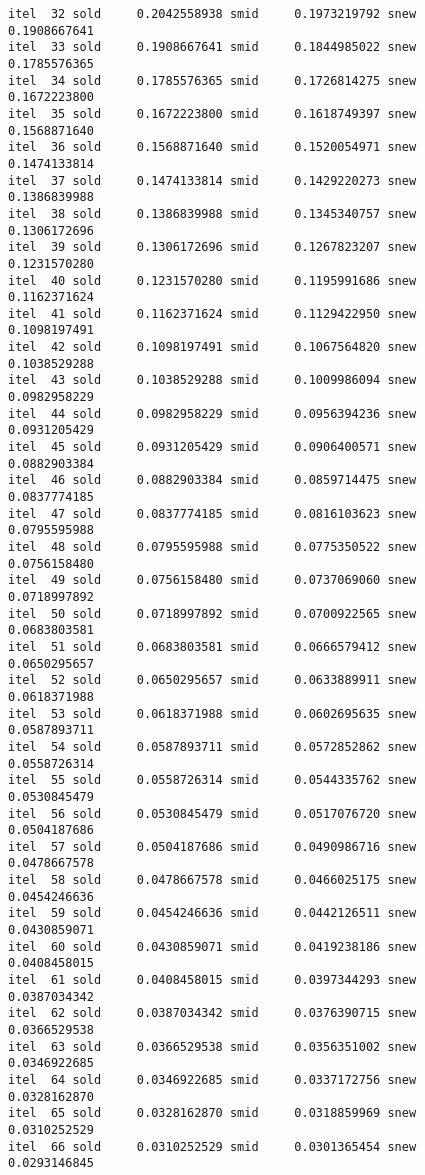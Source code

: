 \documentclass[
  12pt,
  letterpaper,
  DIV=11,
  numbers=noendperiod]{scrartcl}
\begin{document}
\begin{verbatim}
itel  32 sold     0.2042558938 smid     0.1973219792 snew     0.1908667641 
itel  33 sold     0.1908667641 smid     0.1844985022 snew     0.1785576365 
itel  34 sold     0.1785576365 smid     0.1726814275 snew     0.1672223800 
itel  35 sold     0.1672223800 smid     0.1618749397 snew     0.1568871640 
itel  36 sold     0.1568871640 smid     0.1520054971 snew     0.1474133814 
itel  37 sold     0.1474133814 smid     0.1429220273 snew     0.1386839988 
itel  38 sold     0.1386839988 smid     0.1345340757 snew     0.1306172696 
itel  39 sold     0.1306172696 smid     0.1267823207 snew     0.1231570280 
itel  40 sold     0.1231570280 smid     0.1195991686 snew     0.1162371624 
itel  41 sold     0.1162371624 smid     0.1129422950 snew     0.1098197491 
itel  42 sold     0.1098197491 smid     0.1067564820 snew     0.1038529288 
itel  43 sold     0.1038529288 smid     0.1009986094 snew     0.0982958229 
itel  44 sold     0.0982958229 smid     0.0956394236 snew     0.0931205429 
itel  45 sold     0.0931205429 smid     0.0906400571 snew     0.0882903384 
itel  46 sold     0.0882903384 smid     0.0859714475 snew     0.0837774185 
itel  47 sold     0.0837774185 smid     0.0816103623 snew     0.0795595988 
itel  48 sold     0.0795595988 smid     0.0775350522 snew     0.0756158480 
itel  49 sold     0.0756158480 smid     0.0737069060 snew     0.0718997892 
itel  50 sold     0.0718997892 smid     0.0700922565 snew     0.0683803581 
itel  51 sold     0.0683803581 smid     0.0666579412 snew     0.0650295657 
itel  52 sold     0.0650295657 smid     0.0633889911 snew     0.0618371988 
itel  53 sold     0.0618371988 smid     0.0602695635 snew     0.0587893711 
itel  54 sold     0.0587893711 smid     0.0572852862 snew     0.0558726314 
itel  55 sold     0.0558726314 smid     0.0544335762 snew     0.0530845479 
itel  56 sold     0.0530845479 smid     0.0517076720 snew     0.0504187686 
itel  57 sold     0.0504187686 smid     0.0490986716 snew     0.0478667578 
itel  58 sold     0.0478667578 smid     0.0466025175 snew     0.0454246636 
itel  59 sold     0.0454246636 smid     0.0442126511 snew     0.0430859071 
itel  60 sold     0.0430859071 smid     0.0419238186 snew     0.0408458015 
itel  61 sold     0.0408458015 smid     0.0397344293 snew     0.0387034342 
itel  62 sold     0.0387034342 smid     0.0376390715 snew     0.0366529538 
itel  63 sold     0.0366529538 smid     0.0356351002 snew     0.0346922685 
itel  64 sold     0.0346922685 smid     0.0337172756 snew     0.0328162870 
itel  65 sold     0.0328162870 smid     0.0318859969 snew     0.0310252529 
itel  66 sold     0.0310252529 smid     0.0301365454 snew     0.0293146845 

\end{verbatim}
\end{document}
